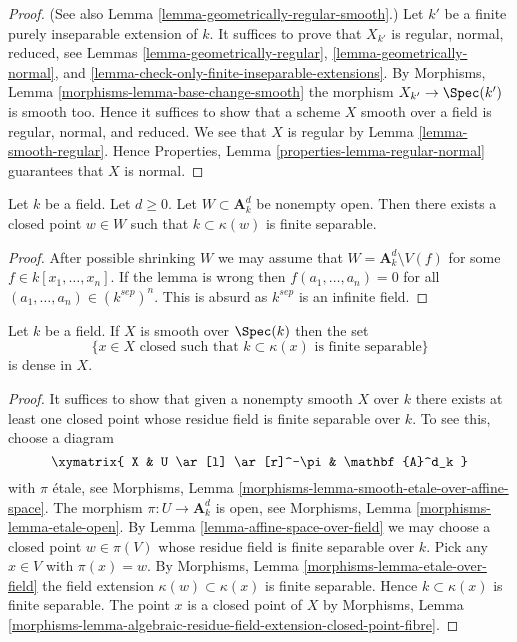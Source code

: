 \begin{proof}
(See also
Lemma \ref{lemma-geometrically-regular-smooth}.)
Let $k'$ be a finite purely inseparable extension of $k$.
It suffices to prove that $X_{k'}$ is regular, normal, reduced, see
Lemmas \ref{lemma-geometrically-regular},
\ref{lemma-geometrically-normal}, and
\ref{lemma-check-only-finite-inseparable-extensions}.
By
Morphisms, Lemma \ref{morphisms-lemma-base-change-smooth}
the morphism $X_{k'} \to \Spec(k')$ is smooth too.
Hence it suffices to show that a scheme $X$ smooth over a field is regular,
normal, and reduced. We see that $X$ is regular by
Lemma \ref{lemma-smooth-regular}.
Hence
Properties, Lemma \ref{properties-lemma-regular-normal}
guarantees that $X$ is normal.
\end{proof}

\begin{lemma}
\label{lemma-affine-space-over-field}
Let $k$ be a field. Let $d \geq 0$. Let $W \subset \mathbf{A}^d_k$
be nonempty open. Then there exists a closed point $w \in W$ such that
$k \subset \kappa(w)$ is finite separable.
\end{lemma}

\begin{proof}
After possible shrinking $W$ we may assume that
$W = \mathbf{A}^d_k \setminus V(f)$ for some $f \in k[x_1, \ldots, x_n]$.
If the lemma is wrong then $f(a_1, \ldots, a_n) = 0$ for all
$(a_1, \ldots, a_n) \in (k^{sep})^n$. This is absurd as $k^{sep}$
is an infinite field.
\end{proof}

\begin{lemma}
\label{lemma-smooth-separable-closed-points-dense}
Let $k$ be a field. If $X$ is smooth over $\Spec(k)$ then
the set
$$
\{x \in X\text{ closed such that }k \subset \kappa(x)
\text{ is finite separable}\}
$$
is dense in $X$.
\end{lemma}

\begin{proof}
It suffices to show that given a nonempty smooth $X$ over $k$
there exists at least one closed point whose residue field is
finite separable over $k$. To see this, choose a diagram
$$
\xymatrix{
X & U \ar[l] \ar[r]^-\pi & \mathbf{A}^d_k
}
$$
with $\pi$ \'etale, see
Morphisms, Lemma \ref{morphisms-lemma-smooth-etale-over-affine-space}.
The morphism $\pi : U \to \mathbf{A}^d_k$ is open, see
Morphisms, Lemma \ref{morphisms-lemma-etale-open}.
By
Lemma \ref{lemma-affine-space-over-field}
we may choose a closed point $w \in \pi(V)$ whose residue field is
finite separable over $k$. Pick any $x \in V$ with $\pi(x) = w$. By
Morphisms, Lemma \ref{morphisms-lemma-etale-over-field}
the field extension $\kappa(w) \subset \kappa(x)$ is finite separable.
Hence $k \subset \kappa(x)$ is finite separable. The point $x$ is a
closed point of $X$ by
Morphisms, Lemma
\ref{morphisms-lemma-algebraic-residue-field-extension-closed-point-fibre}.
\end{proof}

